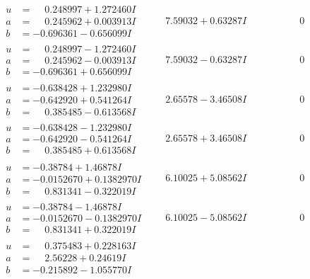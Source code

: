 \documentclass[1p]{elsarticle_modified}
\theoremstyle{definition}
\begin{document}
$$\begin{array}{c|c|c}
\begin{aligned}
u &= \phantom{-}0.248997 + 1.272460 I \\
a &= \phantom{-}0.245962 + 0.003913 I \\
b &= -0.696361 - 0.656099 I\end{aligned}
 & \phantom{-}7.59032 + 0.63287 I & \phantom{-0.000000 } 0 \\ \hline\begin{aligned}
u &= \phantom{-}0.248997 - 1.272460 I \\
a &= \phantom{-}0.245962 - 0.003913 I \\
b &= -0.696361 + 0.656099 I\end{aligned}
 & \phantom{-}7.59032 - 0.63287 I & \phantom{-0.000000 } 0 \\ \hline\begin{aligned}
u &= -0.638428 + 1.232980 I \\
a &= -0.642920 + 0.541264 I \\
b &= \phantom{-}0.385485 - 0.613568 I\end{aligned}
 & \phantom{-}2.65578 - 3.46508 I & \phantom{-0.000000 } 0 \\ \hline\begin{aligned}
u &= -0.638428 - 1.232980 I \\
a &= -0.642920 - 0.541264 I \\
b &= \phantom{-}0.385485 + 0.613568 I\end{aligned}
 & \phantom{-}2.65578 + 3.46508 I & \phantom{-0.000000 } 0 \\ \hline\begin{aligned}
u &= -0.38784 + 1.46878 I \\
a &= -0.0152670 + 0.1382970 I \\
b &= \phantom{-}0.831341 - 0.322019 I\end{aligned}
 & \phantom{-}6.10025 + 5.08562 I & \phantom{-0.000000 } 0 \\ \hline\begin{aligned}
u &= -0.38784 - 1.46878 I \\
a &= -0.0152670 - 0.1382970 I \\
b &= \phantom{-}0.831341 + 0.322019 I\end{aligned}
 & \phantom{-}6.10025 - 5.08562 I & \phantom{-0.000000 } 0 \\ \hline\begin{aligned}
u &= \phantom{-}0.375483 + 0.228163 I \\
a &= \phantom{-}2.56228 + 0.24619 I \\
b &= -0.215892 - 1.055770 I\end{aligned}

\end{array}$$
\end{document}
